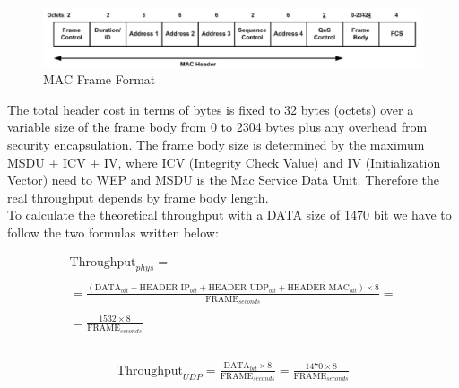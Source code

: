 	\begin{figure}[h!]
		\includegraphics[angle=0, keepaspectratio=true, width=15cm]{../images/mac_header2}
		\caption{MAC Frame Format}
		\label{mac_packet}
	\end{figure}
	
	The total header cost in terms of bytes is fixed to 32 bytes (octets) over a variable size of the frame body from 0 to 2304 bytes plus any overhead from security encapsulation. The frame body size is determined by the maximum MSDU + ICV + IV, where ICV (Integrity Check Value) and IV (Initialization Vector) need to WEP and MSDU is the Mac Service Data Unit. Therefore the real throughput depends by frame body length.\\
	
	
	To calculate the theoretical throughput with a DATA size of 1470 bit we have to follow the two formulas written below:
	
	\begin{gather*}
		\textrm{Throughput}_{phys} = \\\\
		= \frac{ ( \textrm{DATA}_{bit} + \textrm{HEADER IP}_{bit} + \textrm{HEADER UDP}_{bit} + \textrm{HEADER MAC}_{bit} ) \times 8 }{ \textrm{FRAME}_{seconds} } = \\\\
		= \frac{ 1532 \times 8 }{  \textrm{FRAME}_{seconds} } \\\\
	\end{gather*}
	
	\begin{gather*}
		\textrm{Throughput}_{UDP} = \frac{ \textrm{DATA}_{bit} \times 8 }{ \textrm{FRAME}_{seconds} } = \frac{ 1470 \times 8 }{  \textrm{FRAME}_{seconds} } \\\\
	\end{gather*}
	
